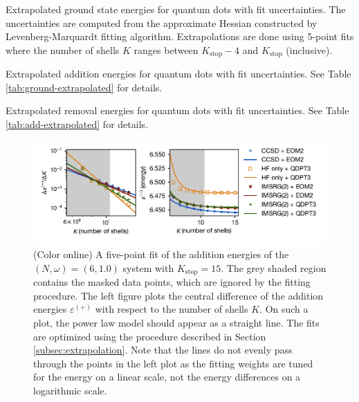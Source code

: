 \begin{table}
  \centering
  \caption{Extrapolated ground state energies for quantum dots with fit uncertainties.  The uncertainties are computed from the approximate Hessian constructed by Levenberg-Marquardt fitting algorithm.  Extrapolations are done using 5-point fits where the number of shells $K$ ranges between $K_{\text{stop}} - 4$ and $K_{\text{stop}}$ (inclusive).}
  \label{tab:ground-extrapolated}
  
\end{table}

\begin{table}
  \centering
  \caption{Extrapolated addition energies for quantum dots with fit uncertainties.  See Table \ref{tab:ground-extrapolated} for details.}
  \label{tab:add-extrapolated}
  
\end{table}

\begin{table}
  \centering
  \caption{Extrapolated removal energies for quantum dots with fit uncertainties.  See Table \ref{tab:add-extrapolated} for details.}
  \label{tab:rm-extrapolated}
  
\end{table}

\begin{figure}
  \centering
  \includegraphics{fig-fit-2-1p0-add.pdf}
  \caption{(Color online) A five-point fit of the addition energies of the $(N, \omega) = (6, 1.0)$ system with $K_{\text{stop}} = 15$.  The grey shaded region contains the masked data points, which are ignored by the fitting procedure.  The left figure plots the central difference of the addition energies $\varepsilon^{(+)}$ with respect to the number of shells $K$.  On such a plot, the power law model should appear as a straight line.  The fits are optimized using the procedure described in Section \ref{subsec:extrapolation}.  Note that the lines do not evenly pass through the points in the left plot as the fitting weights are tuned for the energy on a linear scale, not the energy differences on a logarithmic scale.}
  \label{fig:by-fit-2-1p0-add}
\end{figure}

